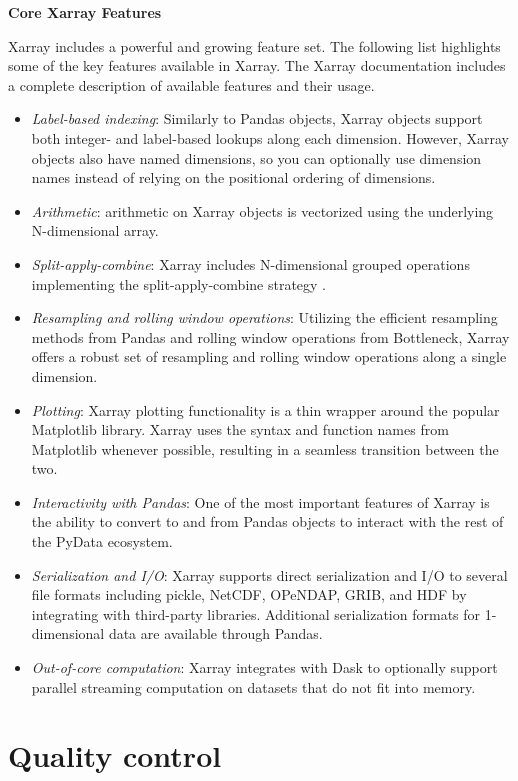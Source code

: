 \documentclass{jors}
\begin{document}
\textbf{Core Xarray Features}

Xarray includes a powerful and growing feature set.
The following list highlights some of the key features available in Xarray.
The Xarray documentation \citep{Xarray_docs} includes a complete description of available features and their usage.

\begin{itemize}
	\item \textit{Label-based indexing}: Similarly to Pandas objects, Xarray objects support both integer- and label-based lookups along each dimension.
	However, Xarray objects also have named dimensions, so you can optionally use dimension names instead of relying on the positional ordering of dimensions.
	\item \textit{Arithmetic}: arithmetic on Xarray objects is vectorized using the underlying N-dimensional array.
	\item \textit{Split-apply-combine}: Xarray includes N-dimensional grouped operations implementing the split-apply-combine strategy \citep{wickham_2011}.
	\item \textit{Resampling and rolling window operations}: Utilizing the efficient resampling methods from Pandas and rolling window operations from Bottleneck, Xarray offers a robust set of resampling and rolling window operations along a single dimension.
	\item \textit{Plotting}: Xarray plotting functionality is a thin wrapper around the popular Matplotlib library.
	Xarray uses the syntax and function names from Matplotlib whenever possible, resulting in a seamless transition between the two.
	\item \textit{Interactivity with Pandas}: One of the most important features of Xarray is the ability to convert to and from Pandas objects to interact with the rest of the PyData ecosystem.
	\item \textit{Serialization and I/O}: Xarray supports direct serialization and I/O to several file formats including pickle, NetCDF, OPeNDAP, GRIB, and HDF by integrating with third-party libraries.
	Additional serialization formats for 1-dimensional data are available through Pandas.
	\item \textit{Out-of-core computation}: Xarray integrates with Dask to optionally support parallel streaming computation on datasets that do not fit into memory.
\end{itemize}

\section*{Quality control}
\end{document}
